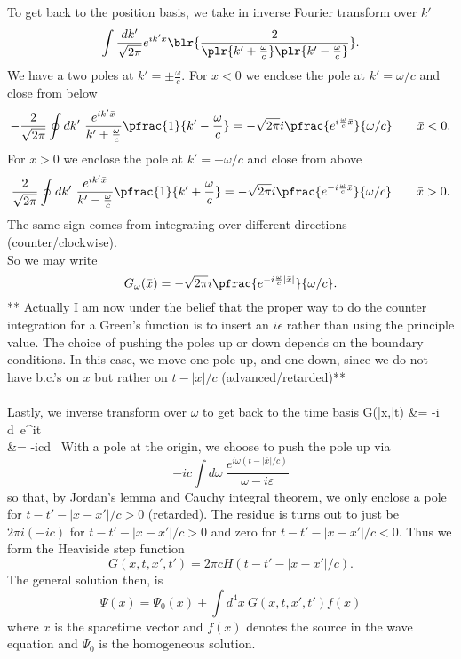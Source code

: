 \documentclass[10pt,letterpaper]{article}
\begin{document}
	To get back to the position basis, we take in inverse Fourier transform over $k'$
	\[
		\int \frac{dk'}{\sqrt{2\pi}} e^{ik'\bar x} \blr{  \frac{2}{\plr{k'+\frac{\omega}{c}}\plr{k'-\frac{\omega}{c}}} }.
	\]
	We have a two poles at $k' = \pm \frac{\omega}{c}$. For $x<0$ we enclose the pole at $k' = \omega/c$ and close from 		below
	\[
		-\frac{2}{\sqrt{2\pi}} \oint dk'\  \frac{e^{ik'\bar x}}{k'+\frac{\omega}{c}} \pfrac{1}{k'-\frac{\omega}{c}} = -\sqrt{2\pi} i					\pfrac{
		e^{i\frac{\omega}{c}\bar x}}{\omega/c} \qquad \bar x<0.
	\]
	For $x>0$ we enclose the pole at $k' = -\omega/c$ and close from above
	\[
		\frac{2}{\sqrt{2\pi}} \oint dk'\  \frac{e^{ik'\bar x}}{k'-\frac{\omega}{c}} \pfrac{1}{k'+\frac{\omega}{c}} = -\sqrt{2\pi} i					\pfrac{
		e^{-i\frac{\omega}{c}\bar x}}{\omega/c} \qquad \bar x>0.
	\]
	The same sign comes from integrating over different directions (counter/clockwise). \\ 
	So we may write
	\[
		G_\omega(\bar x) = -\sqrt{2\pi} i\pfrac{e^{-i\frac{\omega}{c}|\bar x|}}{\omega/c}.
	\]
	** Actually I am now under the belief that the proper way to do the counter integration for a Green's function is to insert 
	an $i\epsilon$ rather than using the principle value. The choice of pushing the poles up or down depends on the boundary 	conditions. In this case,
	we move one pole up, and one down, since we do not have b.c.'s on $x$ but rather on $t-|x|/c$ (advanced/retarded)**\\ \\
	Lastly, we inverse transform over $\omega$ to get back to the time basis
	\ba
		G(\bar x,\bar t) &=  -i \int d\omega\ e^{i\omega t} \\
		&= -ic\int d\omega\  
	\ea
	With a pole at the origin, we choose to push the pole up via
	\[
		-ic\int d\omega\ \frac{ e^{i\omega(t-|\bar x|/c)}}{\omega-i\varepsilon} 
	\]
	so that, by Jordan's lemma and Cauchy integral theorem, we only enclose a pole for $t-t'-|x-x'|/c >0$ (retarded). 
	The residue is turns out to just be $2\pi i(-ic)$ for $t-t'-|x-x'|/c >0$ and zero for $t-t'-|x-x'|/c <0$. Thus
	we form the Heaviside step function
	\[
		G(x,t,x',t') = 2\pi c H(t-t'-|x-x'|/c).
	\]
	The general solution then, is
	\[
		\Psi(x) = \Psi_0(x)+ \int d^4x\ G(x,t,x',t')f(x)
	\]
	where $x$ is the spacetime vector and $f(x)$ denotes the source in the wave equation and $\Psi_0$ is
	the homogeneous solution. \\ \\ 
	\pagebreak
\end{document}
